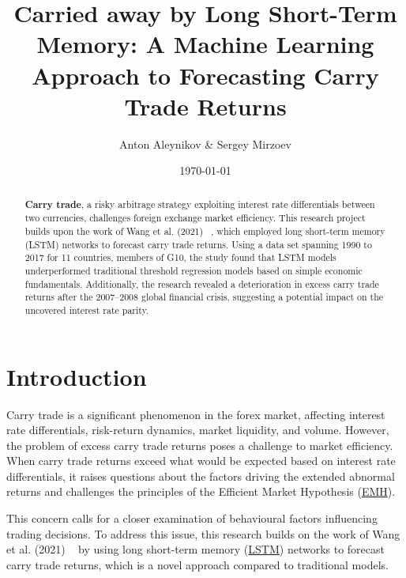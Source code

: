 \documentclass[a4paper,10pt]{article}
\begin{document}
\title{Carried away by Long Short-Term Memory: A Machine Learning Approach to Forecasting Carry Trade Returns}
\author{Anton Aleynikov \& Sergey Mirzoev}
\date{\today}
\maketitle

\begin{abstract}

\textbf{Carry trade}, a risky arbitrage strategy exploiting interest rate differentials between two currencies, challenges foreign exchange market efficiency. This research project builds upon the work of Wang et al. (2021) ~\cite{wang2021machine}, which employed long short-term memory (LSTM) networks to forecast carry trade returns. Using a data set spanning 1990 to 2017 for 11 countries, members of G10, the study found that LSTM models underperformed traditional threshold regression models based on simple economic fundamentals. Additionally, the research revealed a deterioration in excess carry trade returns after the 2007–2008 global financial crisis, suggesting a potential impact on the uncovered interest rate parity.
\end{abstract}

\section{Introduction}


Carry trade is a significant phenomenon in the forex market, affecting interest rate differentials, risk-return dynamics, market liquidity, and volume. However, the problem of excess carry trade returns poses a challenge to market efficiency. When carry trade returns exceed what would be expected based on interest rate differentials, it raises questions about the factors driving the extended abnormal returns and challenges the principles of the Efficient Market Hypothesis (\hyperref[appx:emh]{EMH}).

This concern calls for a closer examination of behavioural factors influencing trading decisions. To address this issue, this research builds on the work of Wang et al. (2021) ~\cite{wang2021machine} by using long short-term memory (\hyperref[appx:lstm]{LSTM}) networks to forecast carry trade returns, which is a novel approach compared to traditional models.
\end{document}
